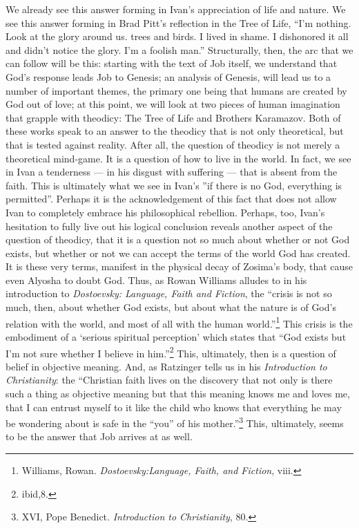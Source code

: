 We already see this answer forming in Ivan's appreciation of life and nature. We see this answer forming in Brad Pitt's reflection in the Tree of Life, ``I'm nothing. Look at the glory around us. trees and birds. I lived in shame. I dishonored it all and didn't notice the glory. I'm a foolish man.'' Structurally, then, the arc that we can follow will be this: starting with the text of Job itself, we understand that God's response leads Job to Genesis; an analysis of Genesis, will lead us to a number of important themes, the primary one being that humans are created by God out of love; at this point, we will look at two pieces of human imagination that grapple with theodicy: The Tree of Life and Brothers Karamazov. Both of these works speak to an answer to the theodicy that is not only theoretical, but that is tested against reality. After all, the question of theodicy is not merely a theoretical mind-game. It is a question of how to live in the world. In fact, we see in Ivan a tenderness --- in his disgust with suffering --- that is absent from the faith. This is ultimately what we see in Ivan's ''if there is no God, everything is permitted''. Perhaps it is the acknowledgement of this fact that does not allow Ivan to completely embrace his philosophical rebellion. Perhaps, too, Ivan's hesitation to fully live out his logical conclusion reveals another aspect of the question of theodicy, that it is a question not so much about whether or not God exists, but whether or not we can accept the terms of the world God has created. It is these very terms, manifest in the physical decay of Zosima's body, that cause even Alyosha to doubt God. Thus, as Rowan Williams alludes to in his introduction to \emph{Dostoevsky: Language, Faith and Fiction}, the ``crisis is not so much, then, about whether God exists, but about what the nature is of God's relation with the world, and most of all with the human world.''\footnote{Williams, Rowan. \emph{Dostoevsky:Language, Faith, and Fiction}, viii.} This crisis is the embodiment of a `serious spiritual perception' which states that ``God exists but I'm not sure whether I believe in him.''\footnote{ibid,8.}
This, ultimately, then is a question of belief in objective meaning. And, as Ratzinger tells us in his \emph{Introduction to Christianity}: the ``Christian faith lives on the discovery that not only is there such a thing as objective meaning but that this meaning knows me and loves me, that I can entrust myself to it like the child who knows that everything he may be wondering about is safe in the ``you'' of his mother.''\footnote{XVI, Pope Benedict. \emph{Introduction to Christianity}, 80.} This, ultimately, seems to be the answer that Job arrives at as well.
